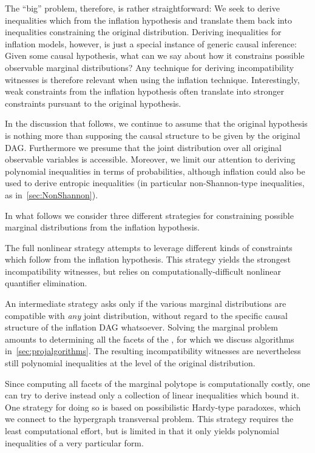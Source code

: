 The ``big'' problem, therefore, is rather straightforward: We seek to derive inequalities which from the inflation hypothesis and translate them back into inequalities constraining the original distribution. Deriving inequalities for inflation models, however, is just a special instance of generic causal inference: Given some causal hypothesis, what can we say about how it constrains possible observable marginal distributions? Any technique for deriving incompatibility witnesses is therefore relevant when using the inflation technique. Interestingly, weak constraints from the inflation hypothesis often translate into stronger constraints pursuant to the original hypothesis.

In the discussion that follows, we continue to assume that the original hypothesis is nothing more than supposing the causal structure to be given by the original DAG. Furthermore we presume that the joint distribution over all original observable variables is accessible. Moreover, we limit our attention to deriving polynomial inequalities in terms of probabilities, although inflation could also be used to derive entropic inequalities (in particular non-Shannon-type inequalities, as in~\cref{sec:NonShannon}).


In what follows we consider three different strategies for constraining possible marginal distributions from the inflation hypothesis. 
\begin{compactitem}
\item The full nonlinear strategy attempts to leverage different kinds of constraints which follow from the inflation hypothesis. This strategy yields the strongest incompatibility witnesses, but relies on computationally-difficult nonlinear quantifier elimination.
\item An intermediate strategy asks only if the various marginal distributions are compatible with \emph{any} joint distribution, without regard to the specific causal structure of the inflation DAG whatsoever. Solving the marginal problem amounts to determining all the facets of the , for which we discuss algorithms in~\cref{sec:projalgorithms}. The resulting incompatibility witnesses are nevertheless still polynomial inequalities at the level of the original distribution.
\item Since computing all facets of the marginal polytope is computationally costly, one can try to derive instead only a collection of linear inequalities which bound it. One strategy for doing so is based on possibilistic Hardy-type paradoxes, which we connect to the hypergraph transversal problem. This strategy requires the least computational effort, but is limited in that it only yields polynomial inequalities of a very particular form.
\end{compactitem}


